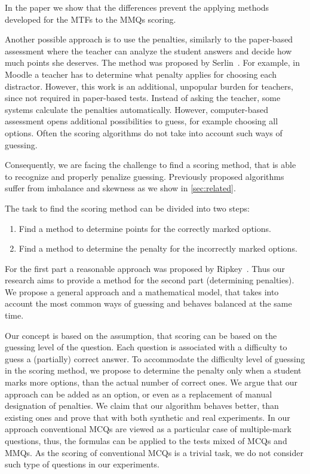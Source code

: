 In the paper we show that the differences prevent the applying methods developed for the MTFs to the MMQs scoring.

Another possible approach is to use the penalties, similarly to the paper-based assessment where the teacher can analyze the student answers and decide how much points she deserves.
The method was proposed by Serlin~\cite{Serlin1978}.
For example, in Moodle a teacher has to determine what penalty applies for choosing each distractor.
However, this work is an additional, unpopular burden for teachers, since not required in paper-based tests.
Instead of asking the teacher, some systems calculate the penalties automatically. 
However, computer-based assessment opens additional possibilities to guess, for example choosing all options.
Often the scoring algorithms do not take into account such ways of guessing.

Consequently, we are facing the challenge to find a scoring method, that is able to recognize and properly penalize guessing.
Previously proposed algorithms suffer from imbalance and skewness as we show in \autoref{sec:related}.

The task to find the scoring method can be divided into two steps:

\begin{enumerate}
	\item Find a method to determine points for the correctly marked options.
	\item Find a method to determine the penalty for the incorrectly marked options.
\end{enumerate}

For the first part a reasonable approach was proposed by Ripkey~\cite{Ripkey1996}.
Thus our research aims to provide a method for the second part (determining penalties).
We propose a general approach and a mathematical model, that takes into account the most common ways of guessing and behaves balanced at the same time.

Our concept is based on the assumption, that scoring can be based on the guessing level of the question.
Each question is associated with a difficulty to guess a (partially) correct answer.
To accommodate the difficulty level of guessing in the scoring method, we propose to determine the penalty only when a student marks more options, than the actual number of correct ones.
We argue that our approach can be added as an option, or even as a replacement of manual designation of penalties.
We claim that our algorithm behaves better, than existing ones and prove that with both synthetic and real experiments.
In our approach conventional MCQs are viewed as a particular case of multiple-mark questions, thus, the formulas can be applied to the tests mixed of MCQs and MMQs.
As the scoring of conventional MCQs is a trivial task, we do not consider such type of questions in our experiments.

